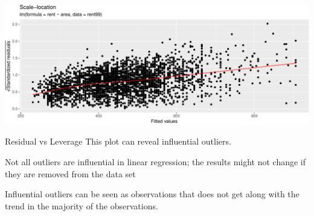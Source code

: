 \documentclass[
  ignorenonframetext,
]{beamer}
\newenvironment{Shaded}{\begin{snugshade}}{\end{snugshade}}
\newcommand{\AttributeTok}[1]{\textcolor[rgb]{0.13,0.29,0.53}{#1}}
\newcommand{\ConstantTok}[1]{\textcolor[rgb]{0.56,0.35,0.01}{#1}}
\newcommand{\FloatTok}[1]{\textcolor[rgb]{0.00,0.00,0.81}{#1}}
\newcommand{\FunctionTok}[1]{\textcolor[rgb]{0.13,0.29,0.53}{\textbf{#1}}}
\newcommand{\NormalTok}[1]{#1}
\newcommand{\SpecialCharTok}[1]{\textcolor[rgb]{0.81,0.36,0.00}{\textbf{#1}}}
\newcommand{\StringTok}[1]{\textcolor[rgb]{0.31,0.60,0.02}{#1}}
\begin{document}
\begin{frame}[fragile]
\begin{Shaded}
\end{Shaded}

\includegraphics{Module02MLRPresentationWeek1_files/figure-beamer/unnamed-chunk-9-1.pdf}
\end{frame}

\begin{frame}
\begin{block}{Residual vs Leverage}
\label{residual-vs-leverage}
This plot can reveal influential outliers.

Not all outliers are influential in linear regression; the results might
not change if they are removed from the data set

Influential outliers can be seen as observations that does not get along
with the trend in the majority of the observations.
\end{block}
\end{frame}
\end{document}
